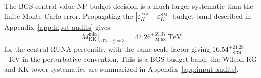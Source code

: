 \documentclass[11pt]{article}
\newcommand{\Mkk}{M_{\mathrm{KK}}}
\newcommand{\gs}{g_s^{\star}}
\newcommand{\eK}{\varepsilon_K}
\begin{document}
The BGS central-value NP-budget decision is a much larger systematic
than the finite-Monte-Carlo error. Propagating the
$|\eK^{\mathrm{exp}}-\eK^{\mathrm{SM}}|$ budget band described in
Appendix~\ref{app:input-audits} gives
\[
  \Mkk^{\min}\bigl|_{50\%,\,\gs=3}
  = 47.26^{+69.37}_{-24.98}\ \mathrm{TeV}
\]
for the central RUNA percentile, with the same scale factor giving
$16.54^{+24.28}_{-8.74}$~TeV in the perturbative convention. This is a
BGS-budget band; the Wilson-RG and KK-tower systematics are summarized
in Appendix~\ref{app:input-audits}.

\end{document}
